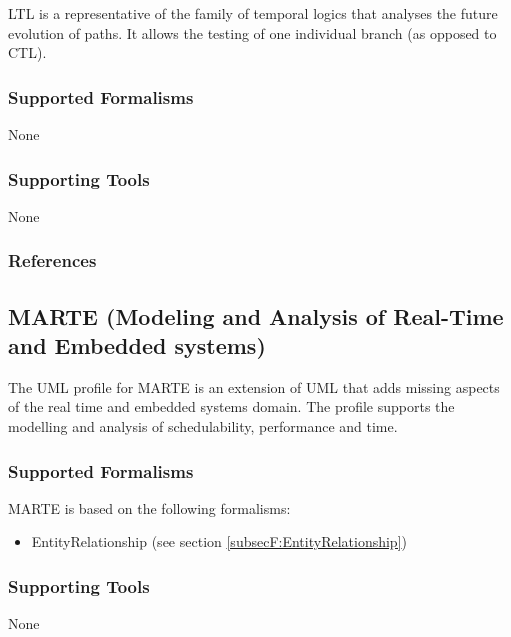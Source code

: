 
LTL is a representative of the family of temporal logics that analyses the future evolution of paths. It allows the testing of one individual branch (as opposed to CTL).

\subsubsection{Supported Formalisms}

None


\subsubsection{Supporting Tools}

None


\subsubsection{References}





\subsection{MARTE (Modeling and Analysis of Real-Time and Embedded systems)}
\label{subsecL:MARTE}


The UML profile for MARTE is an extension of UML that adds missing aspects of the real time and embedded systems domain.
The profile supports the modelling and analysis of schedulability, performance and time.


\subsubsection{Supported Formalisms}

MARTE is based on the following formalisms:
\begin{itemize}
	\item EntityRelationship (see section \ref{subsecF:EntityRelationship})
\end{itemize}


\subsubsection{Supporting Tools}

None



